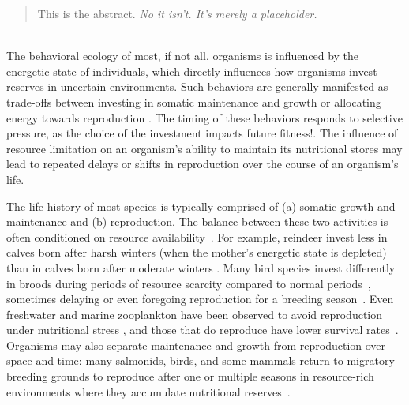 \documentclass{pnastwo}
\begin{document}
\begin{article}

\begin{abstract}
This is the abstract.  \emph{ No it isn't.  It's merely a placeholder.}
\end{abstract}


 \\ \nonumber
The behavioral ecology of most, if not all, organisms is influenced by the
energetic state of individuals, which directly influences how organisms
invest reserves in uncertain environments.  Such behaviors are generally
manifested as trade-offs between investing in somatic maintenance and growth
or allocating energy towards reproduction
\cite{Martin:1987dl,Kirk:1997cc,Kempes:2012hy}. 
The timing of these behaviors responds to selective pressure, as the choice
of the investment impacts future fitness!\cite{Mangel:1988uaa}.
The influence of resource limitation on an organism's ability to maintain its
nutritional stores may lead to repeated delays or shifts in reproduction over
the course of an organism's life.

The life history of most species is typically comprised of (a) somatic growth
and maintenance and (b) reproduction.  The balance between these two
activities is often conditioned on resource
availability~\cite{Morris:1987eo}.  For example, reindeer invest less in
calves born after harsh winters (when the mother's energetic state is
depleted) than in calves born after moderate winters \cite{Tveraa:2003fq}.
Many bird species invest differently in broods during periods of resource
scarcity compared to normal periods~\cite{Daan:1988va,Jacot:2009dv},
sometimes delaying or even foregoing reproduction for a breeding
season~\cite{Martin:1987dl,Stearns:1989ip,Barboza:2002in}.  Even freshwater
and marine zooplankton have been observed to avoid reproduction under
nutritional stress \cite{Threlkeld:1976ih}, and those that do reproduce have
lower survival rates~\cite{Kirk:1997cc}.  Organisms may also separate
maintenance and growth from reproduction over space and time: many salmonids,
birds, and some mammals return to migratory breeding grounds to reproduce
after one or multiple seasons in resource-rich environments where they
accumulate nutritional
reserves~\cite{Weber:1998jg,Mduma:1999cp,Moore:2014hi}.


\end{article}
\end{document}
